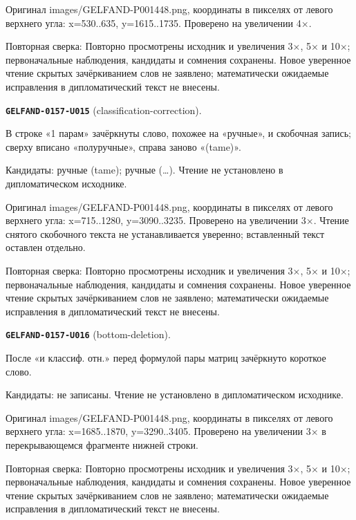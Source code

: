 Оригинал images/GELFAND-P001448.png, координаты в пикселях от левого верхнего угла: x=530..635, y=1615..1735. Проверено на увеличении 4×.\par
Повторная сверка: Повторно просмотрены исходник и увеличения 3×, 5× и 10×; первоначальные наблюдения, кандидаты и сомнения сохранены. Новое уверенное чтение скрытых зачёркиванием слов не заявлено; математически ожидаемые исправления в дипломатический текст не внесены.\par\medskip
\par\noindent\leavevmode{}\label{GELFAND-0157-U015}\label{GELFAND-P001448:classification-correction}\textbf{\texttt{GELFAND-0157-U015}} (classification-correction).\nopagebreak[4]\par
В строке «1 парам» зачёркнуты слово, похожее на «ручные», и скобочная запись; сверху вписано «полуручные», справа заново «(tame)».\par
Кандидаты: ручные (tame); ручные (…). Чтение не установлено в дипломатическом исходнике.\par
Оригинал images/GELFAND-P001448.png, координаты в пикселях от левого верхнего угла: x=715..1280, y=3090..3235. Проверено на увеличении 3×. Чтение снятого скобочного текста не устанавливается уверенно; вставленный текст оставлен отдельно.\par
Повторная сверка: Повторно просмотрены исходник и увеличения 3×, 5× и 10×; первоначальные наблюдения, кандидаты и сомнения сохранены. Новое уверенное чтение скрытых зачёркиванием слов не заявлено; математически ожидаемые исправления в дипломатический текст не внесены.\par\medskip
\par\noindent\leavevmode{}\label{GELFAND-0157-U016}\label{GELFAND-P001448:bottom-deletion}\textbf{\texttt{GELFAND-0157-U016}} (bottom-deletion).\nopagebreak[4]\par
После «и классиф. отн.» перед формулой пары матриц зачёркнуто короткое слово.\par
Кандидаты: не записаны. Чтение не установлено в дипломатическом исходнике.\par
Оригинал images/GELFAND-P001448.png, координаты в пикселях от левого верхнего угла: x=1685..1870, y=3290..3405. Проверено на увеличении 3× в перекрывающемся фрагменте нижней строки.\par
Повторная сверка: Повторно просмотрены исходник и увеличения 3×, 5× и 10×; первоначальные наблюдения, кандидаты и сомнения сохранены. Новое уверенное чтение скрытых зачёркиванием слов не заявлено; математически ожидаемые исправления в дипломатический текст не внесены.\par\medskip
